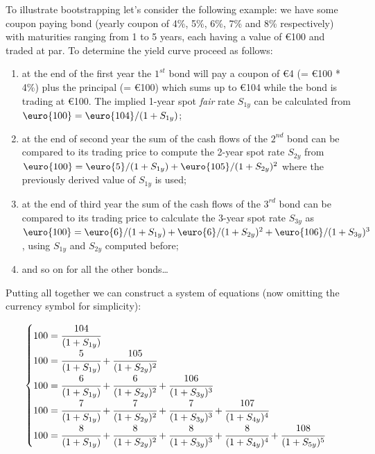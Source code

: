 To illustrate bootstrapping let's consider the following example: we have some coupon paying bond (yearly coupon of 4\%, 5\%, 6\%, 7\% and 8\% respectively) with maturities ranging from 1 to 5 years, each having a value of \euro{100} and traded at par. To determine the yield curve proceed as follows:
\begin{enumerate}
\item at the end of the first year the $1^{st}$ bond will pay a coupon of \euro{4} (= \euro{100} * 4\%) plus the principal (= \euro{100}) which sums up to \euro{104} while the bond is trading at \euro{100}. The implied 1-year spot \emph{fair} rate $S_{1y}$ can be calculated from $\mbox{\euro{100}} = \mbox{\euro{104}} / (1 + S_{1y})$;

\item at the end of second year the sum of the cash flows of the $2^{nd}$ bond can be compared to its trading price to compute the 2-year spot rate $S_{2y}$ from $\mbox{\euro{100}} = \mbox{\euro{5}} / (1 + S_{1y}) + \mbox{\euro{105}} / (1 + S_{2y})^{2}$ where the previously derived value of $S_{1y}$ is used;

\item at the end of third year the sum of the cash flows of the $3^{rd}$ bond can be compared to its trading price to calculate the 3-year spot rate $S_{3y}$ as $\mbox{\euro{100}} = \mbox{\euro{6}} / (1 + S_{1y}) + \mbox{\euro{6}} / (1 + S_{2y})^{2} + \mbox{\euro{106}} / (1 + S_{3y})^{3}$, using $S_{1y}$ and $S_{2y}$ computed before;

\item and so on for all the other bonds\ldots
\end{enumerate}

Putting all together we can construct a system of equations (now omitting the currency symbol for simplicity):

\begin{equation}
\begin{cases}
100 = \cfrac{104}{(1 + S_{1y})} \\
100 = \cfrac{5}{(1 + S_{1y})} + \cfrac{105}{(1 + S_{2y})^{2}} \\
100 = \cfrac{6} {(1 + S_{1y})} + \cfrac{6}{(1 + S_{2y})^{2}} + \cfrac{106} {(1 + S_{3y})^{3}} \\
100 = \cfrac{7} {(1 + S_{1y})} + \cfrac{7} {(1 + S_{2y})^{2}} + \cfrac{7} {(1 + S_{3y})^{3}} + \cfrac{107} {(1 + S_{4y})^{4}} \\
100 = \cfrac{8} {(1 + S_{1y})} + \cfrac{8} {(1 + S_{2y})^{2}}+ \cfrac{8} {(1 + S_{3y})^{3}} + \cfrac{8} {(1 + S_{4y})^{4}} + \cfrac{108} {(1 + S_{5y})^{5}}
\end{cases}
\label{eq:fifth_year_rate}
\end{equation}

